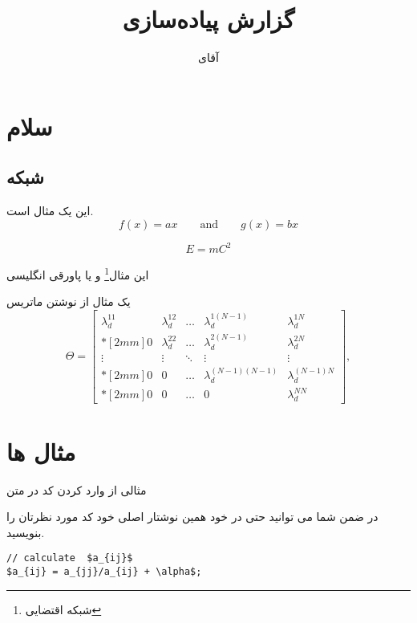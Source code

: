 \documentclass{report}
\title{گزارش پیاده‌سازی}
\author{آقای}
\begin{document}
\Godpage
\maketitle
{}
\tableofcontents
\listoffigures
\listoftables

\chapter{سلام}
\section{شبکه}
این یک مثال است.
\begin{equation}
  f(x)=ax \qquad \text{and} \qquad g(x)=bx 
\end{equation}

\begin{equation}
E = mC^2 
\end{equation}

این مثال\footnote{شبکه اقتضایی} و یا پاورقی انگلیسی

یک مثال از نوشتن ماتریس
\begin{equation}
\Theta =\begin{bmatrix}
\lambda_{d}^{11} & \lambda_{d}^{12} & \ldots & \lambda_{d}^{1(N-1)} & \lambda_{d}^{1N} \\*[2mm]
0 & \lambda_{d}^{22}  & \ldots & \lambda_{d}^{2(N-1)} & \lambda_{d}^{2N} \\
\vdots & \vdots  & \ddots & \vdots & \vdots\\*[2mm]
0 & 0 &  \ldots & \lambda_{d}^{(N-1)(N-1)} & \lambda_{d}^{(N-1)N}\\*[2mm]
0 & 0 &  \ldots & 0 & \lambda_{d}^{NN}
\end{bmatrix},
\label{wqlsdskdksds}
\end{equation}

\chapter{مثال ها}
مثالی از وارد کردن کد در متن
\begin{latin}

\end{latin}
در ضمن شما می توانید حتی در خود همین نوشتار اصلی خود کد مورد نظرتان را بنویسید. 
\begin{latin}
\begin{lstlisting}[mathescape=true]
// calculate  $a_{ij}$
$a_{ij} = a_{jj}/a_{ij} + \alpha$;
\end{lstlisting}
\end{latin}
\end{document}
